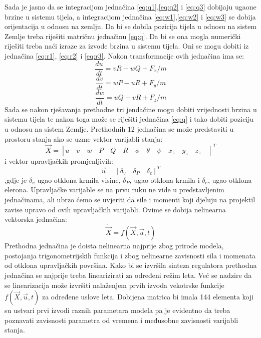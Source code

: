 Sada je jasno da se integracijom jednačina \ref{eq:q1},\ref{eq:q2} i \ref{eq:q3} dobijaju 
ugaone brzine u sistemu tijela, a integracijom jednačina \ref{eq:w1},\ref{eq:w2} i \ref{eq:w3}  se dobija 
orijentacija u odnosu na zemlju. Da bi se dobila pozicija tijela u odnosu na sistem Zemlje
treba riješiti matričnu jednačinu \ref{eq:q}. Da bi se ona mogla numerički riješiti treba 
naći izraze za izvode brzina u sistemu tijela. Oni se mogu dobiti iz jednačina 
\ref{eq:r1}, \ref{eq:r2} i \ref{eq:r3}. Nakon transformacije ovih jednačina ima se:
\begin{equation}
    \frac{du}{dt}=vR-wQ+F_x/m
\end{equation}
\begin{equation}
    \frac{dv}{dt}=wP-uR+F_y/m
\end{equation}
\begin{equation}
    \frac{dw}{dt}=uQ-vR+F_z/m
\end{equation}
Sada se nakon rješavanja prethodne tri jendačine mogu dobiti vrijednosti brzina u sistemu tijela 
te nakon toga može se riješiti jednačina \ref{eq:q} i tako dobiti poziciju u odnosu na sistem Zemlje.
Prethodnih 12 jednačina se može predstaviti u prostoru stanja ako se uzme vektor varijabli stanja:
\[\vec{X}=\left[ u \quad v\quad w\quad P\quad Q\quad R\quad \phi \quad \theta \quad
 \psi \quad x_z\quad y_z\quad z_z\quad \right]^T\] i vektor upravljačkih 
promjenljivih:
\[\vec{u}=\left[\delta_v \quad \delta_P\quad \delta_e \right]^T\] 
,gdje je $\delta_v$ ugao otklona krmila visine, $\delta_P$, ugao otklona krmila 
i $\delta_e$, ugao otklona elerona. Upravljačke varijable se na prvu ruku ne vide u predstavljenim jednačinama, 
ali ubrzo ćemo se uvjeriti da sile i momenti koji djeluju na projektil zavise upravo od ovih upravljačkih 
varijabli.  
Ovime se dobija nelinearna vektorska jednačina:
\begin{equation}
    \dot{\vec{X}}=f(\vec{X},\vec{u},t)
\end{equation}
Prethodna jednačina je doista nelinearna najprije zbog prirode modela, postojanja trigonometrijskih funkcija i 
zbog nelinearne zavisnosti sila i momenata od otklona upravljačkih površina. Kako bi se izvršila sinteza 
regulatora prethodna jednačina se najprije treba linearizirati za određeni režim leta. Već se nadzire 
da se linearizacija može izvršiti nalaženjem prvih izvoda vekotrske funkcije $f(\vec{X},\vec{u},t)$ za određene uslove leta. 
Dobijena matrica bi imala 144 elementa koji su ustvari prvi izvodi raznih parametara modela pa je evidentno 
da treba poznavati zavisnosti parametra od vremena i međusobne zavisnosti varijabli stanja.  




